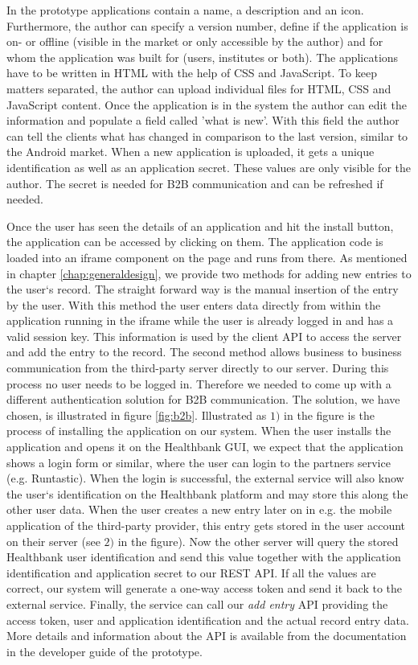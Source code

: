 In the prototype applications contain a name, a description and an icon. Furthermore, the author can specify a version number, define if the application is on- or offline (visible in the market or only accessible by the author) and for whom the application was built for (users, institutes or both). The applications have to be written in HTML with the help of CSS and JavaScript. To keep matters separated, the author can upload individual files for HTML, CSS and JavaScript content. Once the application is in the system the author can edit the information and populate a field called 'what is new'. With this field the author can tell the clients what has changed in comparison to the last version, similar to the Android market. When a new application is uploaded, it gets a unique identification as well as an application secret. These values are only visible for the author. The secret is needed for B2B communication and can be refreshed if needed. 

Once the user has seen the details of an application and hit the install button, the application can be accessed by clicking on them. The application code is loaded into an iframe component on the page and runs from there. As mentioned in chapter \ref{chap:generaldesign}, we provide two methods for adding new entries to the user`s record. The straight forward way is the manual insertion of the entry by the user. With this method the user enters data directly from within the application running in the iframe while the user is already logged in and has a valid session key. This information is used by the client API to access the server and add the entry to the record. The second method allows business to business communication from the third-party server directly to our server. During this process no user needs to be logged in. Therefore we needed to come up with a different authentication solution for B2B communication. The solution, we have chosen, is illustrated in figure \ref{fig:b2b}. Illustrated as $1)$ in the figure is the process of installing the application on our system. When the user installs the application and opens it on the Healthbank GUI, we expect that the application shows a login form or similar, where the user can login to the partners service (e.g. Runtastic). When the login is successful, the external service will also know the user`s identification on the Healthbank platform and may store this along the other user data. When the user creates a new entry later on in e.g. the mobile application of the third-party provider, this entry gets stored in the user account on their server (see $2)$ in the figure). Now the other server will query the stored Healthbank user identification and send this value together with the application identification and application secret to our REST API. If all the values are correct, our system will generate a one-way access token and send it back to the external service. Finally, the service can call our \emph{add entry} API providing the access token, user and application identification and the actual record entry data. More details and information about the API is available from the documentation in the developer guide of the prototype. 

